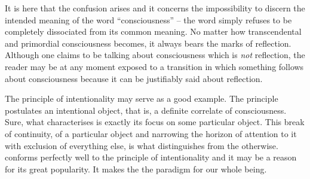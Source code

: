 It is here that the confusion arises and it concerns the impossibility to
discern the intended meaning of the word ``consciousness'' -- the word simply
refuses to be completely dissociated from its common meaning. No matter how
transcendental and primordial consciousness becomes, it always bears the marks
of reflection. Although one claims to be talking about consciousness which is
{\em not} reflection, the reader may be at any moment exposed to a transition in
which something follows about consciousness because it can be justifiably said
about reflection.

\pa The principle of intentionality may serve as a good example.  The principle
postulates an intentional object, that is, a definite correlate of
consciousness. Sure, what characterises  is exactly its
focus on some particular object. This break of continuity,  of
a particular object and narrowing the horizon of attention to it with exclusion
of everything else, is what distinguishes  from the
 otherwise.   conforms perfectly well to the
principle of intentionality and it may be a reason for its great popularity. It
makes the  the paradigm for our whole being.

